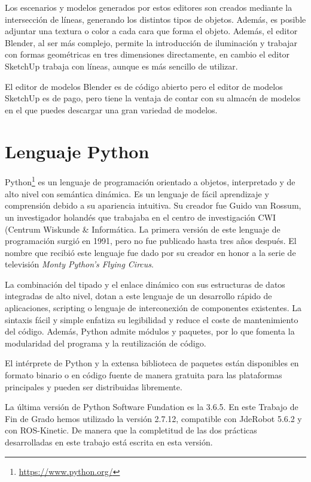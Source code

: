 Los escenarios y modelos generados por estos editores son creados mediante la intersección de líneas, generando los distintos tipos de objetos. Además, es posible adjuntar una textura o color a cada cara que forma el objeto. Además, el editor Blender, al ser más complejo, permite la introducción de iluminación y trabajar con formas geométricas en tres dimensiones directamente, en cambio el editor SketchUp trabaja con líneas, aunque es más sencillo de utilizar.

El editor de modelos Blender es de código abierto pero el editor de modelos SketchUp es de pago, pero tiene la ventaja de contar con su almacén de modelos en el que puedes descargar una gran variedad de modelos.

\section{Lenguaje Python}
Python\footnote{\url{https://www.python.org/}} es un lenguaje de programación orientado a objetos, interpretado y de alto nivel con semántica dinámica. Es un lenguaje de fácil aprendizaje y comprensión debido a su apariencia intuitiva. Su creador fue Guido van Rossum, un investigador holandés que trabajaba en el centro de investigación CWI (Centrum Wiskunde \& Informática. La primera versión de este lenguaje de programación surgió en 1991, pero no fue publicado hasta tres años después. El nombre que recibió este lenguaje fue dado por su creador en honor a la serie de televisión \textit{Monty Python's Flying Circus}.

La combinación del tipado y el enlace dinámico con sus estructuras de datos integradas de alto nivel, dotan a este lenguaje de un desarrollo rápido de aplicaciones, scripting o lenguaje de interconexión de componentes existentes. La sintaxis fácil y simple enfatiza su legibilidad y reduce el coste de mantenimiento del código. Además, Python admite módulos y paquetes, por lo que fomenta la modularidad del programa y la reutilización de código.

El intérprete de Python y la extensa biblioteca de paquetes están disponibles en formato binario o en código fuente de manera gratuita para las plataformas principales y pueden ser distribuidas libremente.

La última versión de Python Software Fundation es la 3.6.5. En este Trabajo de Fin de Grado hemos utilizado la versión 2.7.12, compatible con JdeRobot 5.6.2 y con ROS-Kinetic. De manera que la completitud de las dos prácticas desarrolladas en este trabajo está escrita en esta versión.

